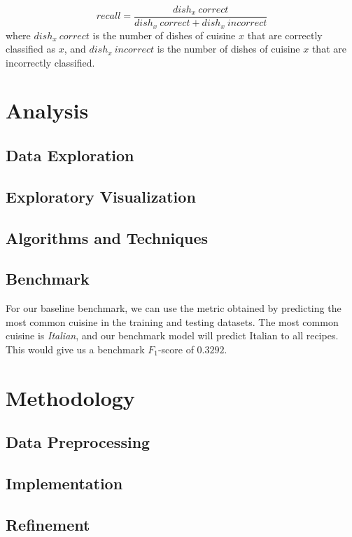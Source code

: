 \documentclass[12pt]{article}
\begin{document}
\begin{equation}
recall = \frac{\textit{$dish_x\: correct$}}{\textit{$dish_x\: correct$} + \textit{$dish_x\: incorrect$}}
\end{equation}
%
where $dish_x\: correct$ is the number of dishes of cuisine $x$ that are correctly classified as $x$, and $dish_x\: incorrect$ is the number of dishes of cuisine $x$ that are incorrectly classified.

\section{Analysis}
\subsection{Data Exploration}

\subsection{Exploratory Visualization}

\subsection{Algorithms and Techniques}

\subsection{Benchmark}
For our baseline benchmark, we can use the metric obtained by predicting the most common cuisine in the training and testing datasets. The most common cuisine is \textit{Italian}, and our benchmark model will predict Italian to all recipes. This would give us a benchmark $F_1$-score of $0.3292$.

\section{Methodology}
\subsection{Data Preprocessing}

\subsection{Implementation}

\subsection{Refinement}
\end{document}
